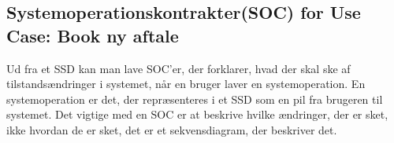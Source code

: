 %
%
%

\subsection{Systemoperationskontrakter(SOC) for Use Case: Book ny aftale}\label{Operation:Book ny aftale}

Ud fra et SSD kan man lave SOC'er, der forklarer, hvad der skal ske af tilstandsændringer i systemet, når en bruger laver en systemoperation.
En systemoperation er det, der repræsenteres i et SSD som en pil fra brugeren til systemet.
Det vigtige med en SOC er at beskrive hvilke ændringer, der er sket, ikke hvordan de er sket, det er et sekvensdiagram, der beskriver det.


